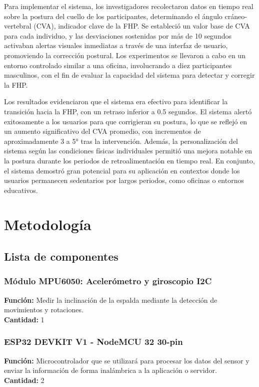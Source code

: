 \documentclass[manuscript,screen,review]{acmart}
\begin{document}
Para implementar el sistema, los investigadores recolectaron datos en tiempo real sobre la postura del cuello de los participantes, determinando el ángulo cráneo-vertebral (CVA), indicador clave de la FHP. Se estableció un valor base de CVA para cada individuo, y las desviaciones sostenidas por más de 10 segundos activaban alertas visuales inmediatas a través de una interfaz de usuario, promoviendo la corrección postural. Los experimentos se llevaron a cabo en un entorno controlado similar a una oficina, involucrando a diez participantes masculinos, con el fin de evaluar la capacidad del sistema para detectar y corregir la FHP.

Los resultados evidenciaron que el sistema era efectivo para identificar la transición hacia la FHP, con un retraso inferior a 0.5 segundos. El sistema alertó exitosamente a los usuarios para que corrigieran su postura, lo que se reflejó en un aumento significativo del CVA promedio, con incrementos de aproximadamente 3 a 5° tras la intervención. Además, la personalización del sistema según las condiciones físicas individuales permitió una mejora notable en la postura durante los periodos de retroalimentación en tiempo real. En conjunto, el sistema demostró gran potencial para su aplicación en contextos donde los usuarios permanecen sedentarios por largos periodos, como oficinas o entornos educativos.



\section{Metodología}

\subsection{Lista de componentes}
\subsubsection{Módulo MPU6050: Acelerómetro y giroscopio I2C}
\textbf{Función:} Medir la inclinación de la espalda mediante la detección de movimientos y rotaciones. \\
\textbf{Cantidad:} 1

\subsubsection{ESP32 DEVKIT V1 - NodeMCU 32 30-pin}
\textbf{Función:} Microcontrolador que se utilizará para procesar los datos del sensor y enviar la información de forma inalámbrica a la aplicación o servidor. \\
\textbf{Cantidad:} 2
\end{document}
